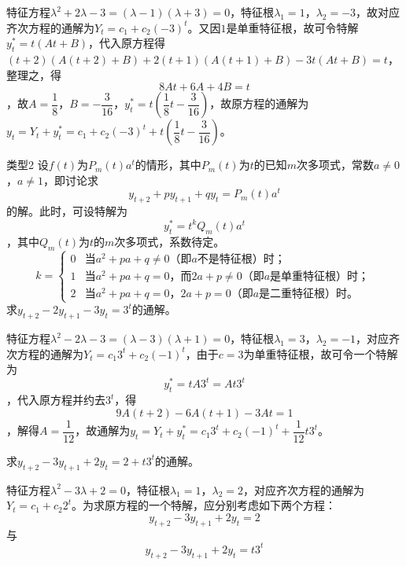 		\answer 特征方程$\lambda ^2 + 2\lambda - 3 = (\lambda - 1)(\lambda + 3) = 0$，特征根$\lambda _1 = 1$，$\lambda _2 = -3$，故对应齐次方程的通解为$Y_t = c_1 + c_2(-3)^t$。又因$1$是单重特征根，故可令特解$y^*_t = t(At + B)$，代入原方程得$(t+2)(A(t+2)+B) + 2(t+1)(A(t+1) + B) -3t(At + B) = t$，整理之，得$$8At + 6A + 4B = t$$，故$A=\dfrac{1}{8}$，$B=-\dfrac{3}{16}$，$y^*_t = t(\dfrac{1}{8} t - \dfrac{3}{16})$，故原方程的通解为$y_t = Y_t + y^*_t = c_1 + c_2(-3)^t + t(\dfrac{1}{8} t - \dfrac{3}{16})$。

		{\heiti 类型2} \quad 设$f(t)$为$P_m(t)a^t$的情形，其中$P_m(t)$为$t$的已知$m$次多项式，常数$a \neq 0$，$a \neq 1$，即讨论求
		\begin{equation}\label{eq:5-20}
			y_{t+2} + py_{t+1} + qy_t = P_m(t)a^t
		\end{equation}
		的解。此时，可设特解为$$y^*_t = t^kQ_m(t)a^t$$，其中$Q_m(t)$为$t$的$m$次多项式，系数待定。
		\begin{displaymath}
			k = 
			\begin{cases}
				0 & \text{当$a^2 + pa + q \neq 0$（即$a$不是特征根）时；} \\
				1 & \text{当$a^2 + pa + q = 0$，而$2a + p \neq 0$（即$a$是单重特征根）时；} \\
				2 & \text{当$a^2 + pa + q = 0$，$2a + p = 0$（即$a$是二重特征根）时。}
			\end{cases}
		\end{displaymath}
		\example 求$y_{t+2} - 2y_{t+1} - 3y_t = 3^t$的通解。

		\answer 特征方程$\lambda ^2 - 2\lambda -3 = (\lambda -3)(\lambda + 1) = 0$，特征根$\lambda _1 = 3$，$\lambda _2 = -1$，对应齐次方程的通解为$Y_t = c_1 3^t + c_2 (-1)^t$，由于$c=3$为单重特征根，故可令一个特解为$$y^*_t = tA3^t = At3^t$$，代入原方程并约去$3^t$，得$$9A(t+2) - 6A(t+1) -3At = 1$$，解得$A = \dfrac{1}{12}$，故通解为$y_t = Y_t + y^*_t = c_1 3^t + c_2 (-1)^t + \dfrac{1}{12}t 3^t$。

		\example 求$y_{t+2} - 3y_{t+1} + 2y_t = 2 + t 3^t$的通解。

		\answer 特征方程$\lambda ^ 2 - 3 \lambda + 2 = 0$，特征根$\lambda _1 = 1$，$\lambda _2 = 2$，对应齐次方程的通解为$Y_t = c_1 + c_2 2^t$。为求原方程的一个特解，应分别考虑如下两个方程：
		\begin{equation}\label{eq:5-21}
			y_{t+2} - 3y_{t+1} + 2y_t = 2
		\end{equation}
		与
		\begin{equation}\label{eq:5-22}
			y_{t+2} - 3y_{t+1} + 2y_t = t 3^t
		\end{equation}

